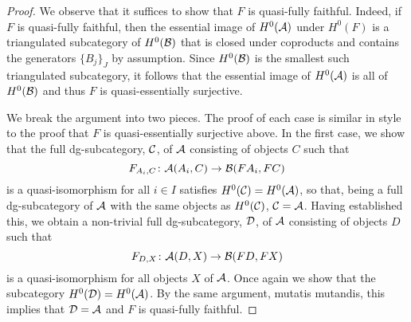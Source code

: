 \begin{proof}
  We observe that it suffices to show that \(F\) is quasi-fully faithful.
  Indeed, if \(F\) is quasi-fully faithful, then the essential image of \(H^0(\mathcal{A})\) under \(H^0(F)\) is a triangulated subcategory of \(H^0(\mathcal{B})\) that is closed under coproducts and contains the generators \(\{B_j\}_J\) by assumption.
  Since \(H^0(\mathcal{B})\) is the smallest such triangulated subcategory, it follows that the essential image of \(H^0(\mathcal{A})\) is all of \(H^0(\mathcal{B})\) and thus \(F\) is quasi-essentially surjective.

  We break the argument into two pieces.
  The proof of each case is similar in style to the proof that \(F\) is quasi-essentially surjective above.
  In the first case, we show that the full dg-subcategory, \(\mathcal{C}\), of \(\mathcal{A}\) consisting of objects \(C\) such that
  \[F_{A_i,C} \colon \mathcal{A}(A_i, C) \to \mathcal{B}(FA_i, FC)\]
  is a quasi-isomorphism for all \(i \in I\) satisfies \(H^0(\mathcal{C}) = H^0(\mathcal{A})\), so that, being a full dg-subcategory of \(\mathcal{A}\) with the same objects as \(H^0(\mathcal{C})\), \(\mathcal{C} = \mathcal{A}\).
  Having established this, we obtain a non-trivial full dg-subcategory, \(\mathcal{D}\), of \(\mathcal{A}\) consisting of objects \(D\) such that
  \[F_{D,X} \colon \mathcal{A}(D,X) \to \mathcal{B}(FD, FX)\]
  is a quasi-isomorphism for all objects \(X\) of \(\mathcal{A}\).
  Once again we show that the subcategory \(H^0(\mathcal{D}) = H^0(\mathcal{A})\).
  By the same argument, mutatis mutandis, this implies that \(\mathcal{D} = \mathcal{A}\) and \(F\) is quasi-fully faithful.


\end{proof}

